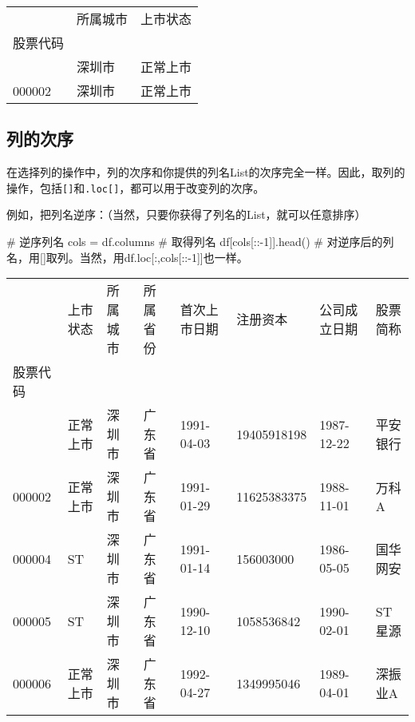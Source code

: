 \documentclass[
  letterpaper,
  DIV=11,
  numbers=noendperiod]{scrreprt}
\newenvironment{Shaded}{\begin{snugshade}}{\end{snugshade}}
\newcommand{\CommentTok}[1]{\textcolor[rgb]{0.37,0.37,0.37}{#1}}
\newcommand{\DecValTok}[1]{\textcolor[rgb]{0.68,0.00,0.00}{#1}}
\newcommand{\NormalTok}[1]{\textcolor[rgb]{0.00,0.23,0.31}{#1}}
\newcommand{\OperatorTok}[1]{\textcolor[rgb]{0.37,0.37,0.37}{#1}}
\begin{document}
\begin{longtable}[]{@{}lll@{}}
\toprule\noalign{}
& 所属城市 & 上市状态 \\
股票代码 & & \\
\midrule\noalign{}
\endhead
\bottomrule\noalign{}
\endlastfoot
000001 & 深圳市 & 正常上市 \\
000002 & 深圳市 & 正常上市 \\
\end{longtable}

\hypertarget{ux5217ux7684ux6b21ux5e8f}{%
\subsection{列的次序}\label{ux5217ux7684ux6b21ux5e8f}}

在选择列的操作中，列的次序和你提供的列名List的次序完全一样。因此，取列的操作，包括\texttt{{[}{]}}和\texttt{.loc{[}{]}}，都可以用于改变列的次序。

例如，把列名逆序：（当然，只要你获得了列名的List，就可以任意排序）

\begin{Shaded}
\begin{Highlighting}[]
\CommentTok{\# 逆序列名}
\NormalTok{cols }\OperatorTok{=}\NormalTok{ df.columns }\CommentTok{\# 取得列名}
\NormalTok{df[cols[::}\OperatorTok{{-}}\DecValTok{1}\NormalTok{]].head() }\CommentTok{\# 对逆序后的列名，用\textasciigrave{}[]\textasciigrave{}取列。当然，用df.loc[:,cols[::{-}1]]也一样。}
\end{Highlighting}
\end{Shaded}

\begin{longtable}[]{@{}llllllll@{}}
\toprule\noalign{}
& 上市状态 & 所属城市 & 所属省份 & 首次上市日期 & 注册资本 &
公司成立日期 & 股票简称 \\
股票代码 & & & & & & & \\
\midrule\noalign{}
\endhead
\bottomrule\noalign{}
\endlastfoot
000001 & 正常上市 & 深圳市 & 广东省 & 1991-04-03 & 19405918198 &
1987-12-22 & 平安银行 \\
000002 & 正常上市 & 深圳市 & 广东省 & 1991-01-29 & 11625383375 &
1988-11-01 & 万科A \\
000004 & ST & 深圳市 & 广东省 & 1991-01-14 & 156003000 & 1986-05-05 &
国华网安 \\
000005 & ST & 深圳市 & 广东省 & 1990-12-10 & 1058536842 & 1990-02-01 &
ST 星源 \\
000006 & 正常上市 & 深圳市 & 广东省 & 1992-04-27 & 1349995046 &
1989-04-01 & 深振业A \\
\end{longtable}
\end{document}
